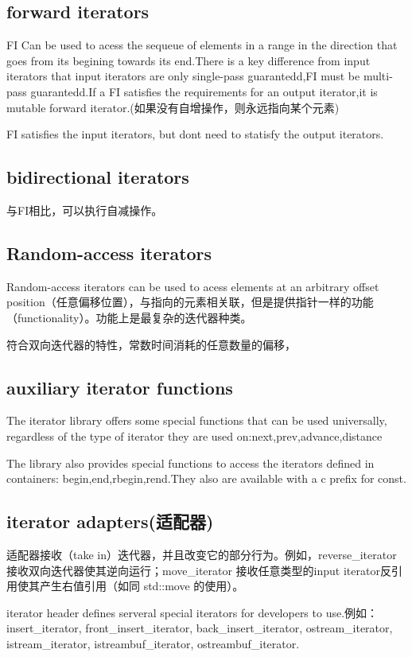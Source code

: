 \subsection*{forward iterators}

FI Can be used to acess the sequeue of elements in a range in the direction that goes from its begining towards its end.\+There is a key difference from input iterators that input iterators are only single-\/pass guarantedd,FI must be multi-\/pass guarantedd.\+If a FI satisfies the requirements for an output iterator,it is mutable forward iterator.(如果没有自增操作，则永远指向某个元素)

FI satisfies the input iterators, but don\textquotesingle{}t need to statisfy the output iterators.

\subsection*{bidirectional iterators}

与\+F\+I相比，可以执行自减操作。

\subsection*{Random-\/access iterators}

Random-\/access iterators can be used to acess elements at an arbitrary offset position（任意偏移位置），与指向的元素相关联，但是提供指针一样的功能（functionality）。功能上是最复杂的迭代器种类。

符合双向迭代器的特性，常数时间消耗的任意数量的偏移，

\subsection*{auxiliary iterator functions}

The iterator library offers some special functions that can be used universally, regardless of the type of iterator they are used on\+:next,prev,advance,distance

The library also provides special functions to access the iterators defined in containers\+: begin,end,rbegin,rend.\+They also are available with a c prefix for const.

\subsection*{iterator adapters(适配器)}

适配器接收（take in）迭代器，并且改变它的部分行为。例如，reverse\+\_\+iterator 接收双向迭代器使其逆向运行；move\+\_\+iterator 接收任意类型的input iterator反引用使其产生右值引用（如同 std\+::move 的使用）。

iterator header defines serveral special iterators for developers to use.\+例如：insert\+\_\+iterator, front\+\_\+insert\+\_\+iterator, back\+\_\+insert\+\_\+iterator, ostream\+\_\+iterator, istream\+\_\+iterator, istreambuf\+\_\+iterator, ostreambuf\+\_\+iterator. 